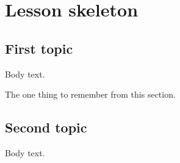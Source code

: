\documentclass[../main.tex]{subfiles}
\begin{document}
\chapter{Lesson skeleton}

\section{First topic}

Body text.

\begin{keypoint}
  The one thing to remember from this section.
\end{keypoint}

\section{Second topic}

Body text.
\end{document}
